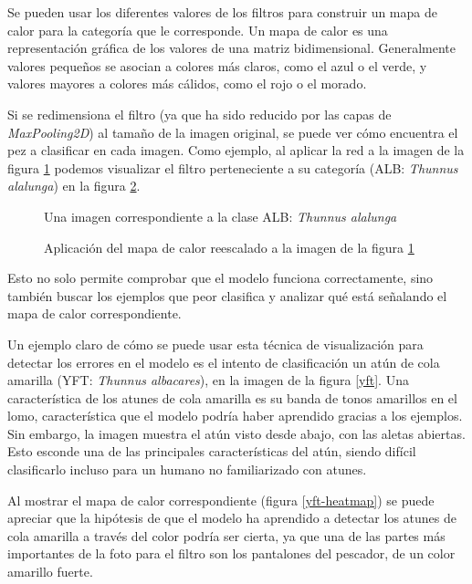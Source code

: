 Se pueden usar los diferentes valores de los filtros para construir un mapa de
calor para la categoría que le corresponde. Un mapa de calor es una
representación gráfica de los valores de una matriz bidimensional. Generalmente
valores pequeños se asocian a colores más claros, como el azul o el verde, y
valores mayores a colores más cálidos, como el rojo o el morado.

Si se redimensiona el filtro (ya que ha sido reducido por las capas de
\textit{MaxPooling2D}) al tamaño de la imagen original, se puede ver cómo
encuentra el pez a clasificar en cada imagen. Como ejemplo, al aplicar la red a
la imagen de la figura \ref{fc-fish} podemos visualizar el filtro perteneciente
a su categoría (ALB: \textit{Thunnus alalunga}) en la figura \ref{fc-heatmap}.

\begin{figure}
    \caption{Una imagen correspondiente a la clase ALB: \textit{Thunnus alalunga}}
\label{fc-fish}
\end{figure}

\begin{figure}
    \caption{Aplicación del mapa de calor reescalado a la imagen de la figura \ref{fc-fish}}
\label{fc-heatmap}
\end{figure}

Esto no solo permite comprobar que el modelo funciona correctamente, sino también buscar los ejemplos que peor clasifica y analizar qué está señalando el mapa de calor correspondiente.

Un ejemplo claro de cómo se puede usar esta técnica de visualización para
detectar los errores en el modelo es el intento de clasificación un atún de
cola amarilla (YFT: \textit{Thunnus albacares}), en la imagen de la figura
\ref{yft}. Una característica de los atunes de cola amarilla es su banda de
tonos amarillos en el lomo, característica que el modelo podría haber aprendido
gracias a los ejemplos. Sin embargo, la imagen muestra el atún visto
desde abajo, con las aletas abiertas. Esto esconde una de las principales
características del atún, siendo difícil clasificarlo incluso para un humano no
familiarizado con atunes.

Al mostrar el mapa de calor correspondiente (figura \ref{yft-heatmap}) se puede
apreciar que la hipótesis de que el modelo ha aprendido a detectar los atunes
de cola amarilla a través del color podría ser cierta, ya que una de las partes
más importantes de la foto para el filtro son los pantalones del pescador, de
un color amarillo fuerte.

